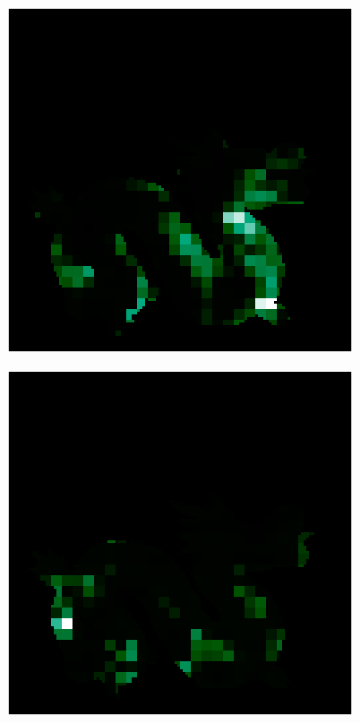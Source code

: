 \begin{figure}[H]
	\centering
	\captionsetup{width=\linewidth}
	\begin{minipage}{0.32\linewidth}
		\begin{subfigure}[t]{0.45\linewidth}
			\includegraphics[width=\linewidth]{./Figures/feature_map_gcnn/feature_map_gcnn-cnn_2.png}
		\end{subfigure}
		\begin{subfigure}[t]{0.45\linewidth}
			\includegraphics[width=\linewidth]{./Figures/feature_map_gcnn/feature_map_gcnn-cnn_46.png}
		\end{subfigure}
		

\end{minipage}
\end{figure}
